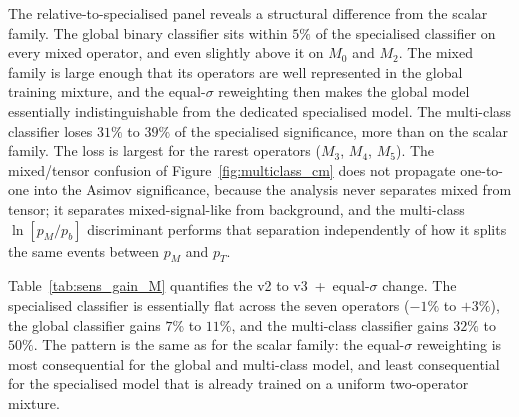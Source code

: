 The relative-to-specialised panel reveals a structural difference from the scalar family. The global binary classifier sits within $5\%$ of the specialised classifier on every mixed operator, and even slightly above it on $M_0$ and $M_2$. The mixed family is large enough that its operators are well represented in the global training mixture, and the equal-$\sigma$ reweighting then makes the global model essentially indistinguishable from the dedicated specialised model. The multi-class classifier loses $31\%$ to $39\%$ of the specialised significance, more than on the scalar family. The loss is largest for the rarest operators ($M_3$, $M_4$, $M_5$). The mixed/tensor confusion of Figure~\ref{fig:multiclass_cm} does not propagate one-to-one into the Asimov significance, because the analysis never separates mixed from tensor; it separates mixed-signal-like from background, and the multi-class $\ln[p_M/p_b]$ discriminant performs that separation independently of how it splits the same events between $p_M$ and $p_T$.

Table~\ref{tab:sens_gain_M} quantifies the v2 to v3~+~equal-$\sigma$ change. The specialised classifier is essentially flat across the seven operators ($-1\%$ to $+3\%$), the global classifier gains $7\%$ to $11\%$, and the multi-class classifier gains $32\%$ to $50\%$. The pattern is the same as for the scalar family: the equal-$\sigma$ reweighting is most consequential for the global and multi-class model, and least consequential for the specialised model that is already trained on a uniform two-operator mixture.

